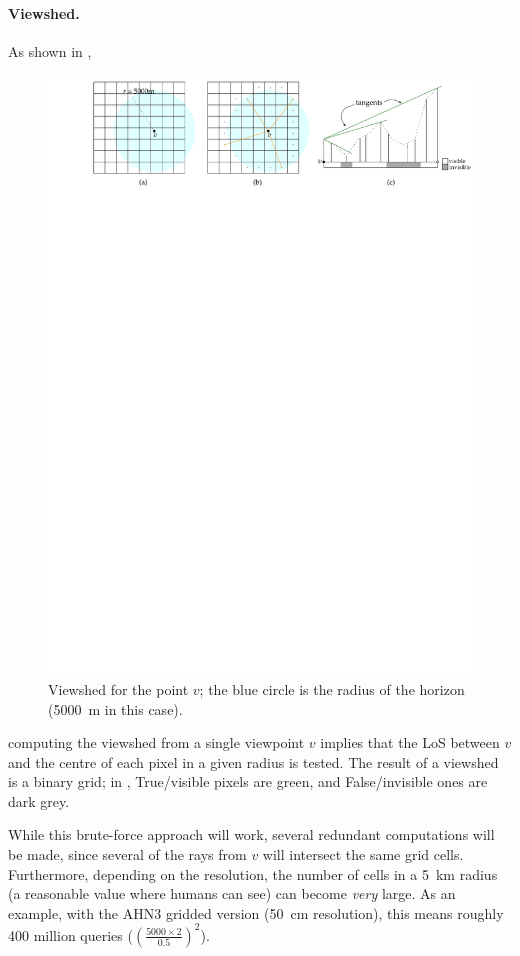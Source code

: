 \paragraph{Viewshed.}
As shown in ,
\begin{figure}
  \centering
  \includegraphics[width=\linewidth]{figs/viewshed}
  \caption{Viewshed for the point $v$; the blue circle is the radius of the horizon (\qty{5000}{\m} in this case).}%
\end{figure}
computing the viewshed from a single viewpoint $v$ implies that the LoS between $v$ and the centre of each pixel in a given radius is tested. 
The result of a viewshed is a binary grid; in , True/visible pixels are green, and False/invisible ones are dark grey.

%

While this brute-force approach will work, several redundant computations will be made, since several of the rays from $v$ will intersect the same grid cells.
Furthermore, depending on the resolution, the number of cells in a \qty{5}{\km} radius (a reasonable value where humans can see) can become \emph{very} large.
As an example, with the AHN3 gridded version (\qty{50}{\cm} resolution), this means roughly 400 million queries ($(\frac{5000 \times 2}{0.5})^2$).

